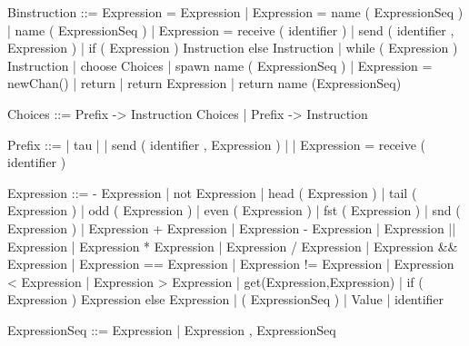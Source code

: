 \documentclass[11pt]{report}
\begin{document}
\begin{verbnobox}[\normalfont]
Binstruction ::= Expression = Expression 
                 | Expression = name ( ExpressionSeq )
                 | name ( ExpressionSeq )
                 | Expression = receive ( identifier )
                 | send ( identifier , Expression )
                 | if ( Expression ) { Instruction } else { Instruction }
                 | while ( Expression ) { Instruction }
                 | choose { Choices }
                 | spawn name ( ExpressionSeq )
                 | Expression = newChan()
                 | return
                 | return Expression
                 | return name (ExpressionSeq)
\end{verbnobox}
\vspace*{3pt}

\begin{verbnobox}[\normalfont]
Choices ::= Prefix -> { Instruction } Choices | Prefix -> { Instruction }
\end{verbnobox}
\vspace*{3pt}

\begin{verbnobox}[\normalfont]
Prefix ::= | tau
         | | send ( identifier , Expression )
         | | Expression = receive ( identifier )
\end{verbnobox}
\vspace*{3pt}

\begin{verbnobox}[\normalfont]
Expression ::= - Expression
               | not Expression
               | head ( Expression )
               | tail ( Expression )
               | odd ( Expression )
               | even ( Expression )
               | fst ( Expression )
               | snd ( Expression )
               | Expression + Expression
               | Expression - Expression
               | Expression || Expression
               | Expression * Expression
               | Expression / Expression
               | Expression && Expression
               | Expression == Expression
               | Expression != Expression 
               | Expression < Expression
               | Expression > Expression
               | get(Expression,Expression)
               | if ( Expression ) { Expression } else { Expression }
               | ( ExpressionSeq )
               | Value
               | identifier
\end{verbnobox}
\vspace*{3pt}

\begin{verbnobox}[\normalfont]
ExpressionSeq ::= Expression | Expression , ExpressionSeq
\end{verbnobox}
\vspace*{3pt}
\end{document}
